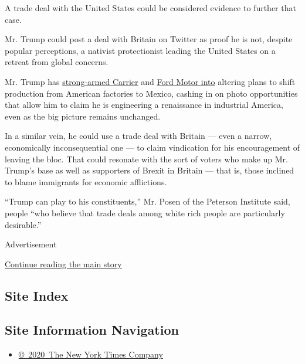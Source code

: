 A trade deal with the United States could be considered evidence to
further that case.

Mr. Trump could post a deal with Britain on Twitter as proof he is not,
despite popular perceptions, a nativist protectionist leading the United
States on a retreat from global concerns.

Mr. Trump has
\href{https://www.nytimes.com/2016/12/01/business/economy/trump-carrier-pence-jobs.html}{strong-armed
Carrier} and
\href{https://www.nytimes.com/2016/11/19/business/ford-move-cited-as-victory-by-trump-has-no-effect-on-us-jobs.html}{Ford
Motor into} altering plans to shift production from American factories
to Mexico, cashing in on photo opportunities that allow him to claim he
is engineering a renaissance in industrial America, even as the big
picture remains unchanged.

In a similar vein, he could use a trade deal with Britain --- even a
narrow, economically inconsequential one --- to claim vindication for
his encouragement of leaving the bloc. That could resonate with the sort
of voters who make up Mr. Trump's base as well as supporters of Brexit
in Britain --- that is, those inclined to blame immigrants for economic
afflictions.

``Trump can play to his constituents,'' Mr. Posen of the Peterson
Institute said, people ``who believe that trade deals among white rich
people are particularly desirable.''

Advertisement

\protect\hyperlink{after-bottom}{Continue reading the main story}

\hypertarget{site-index}{%
\subsection{Site Index}\label{site-index}}

\hypertarget{site-information-navigation}{%
\subsection{Site Information
Navigation}\label{site-information-navigation}}

\begin{itemize}
\tightlist
\item
  \href{https://help.nytimes.com/hc/en-us/articles/115014792127-Copyright-notice}{©~2020~The
  New York Times Company}
\end{itemize}


